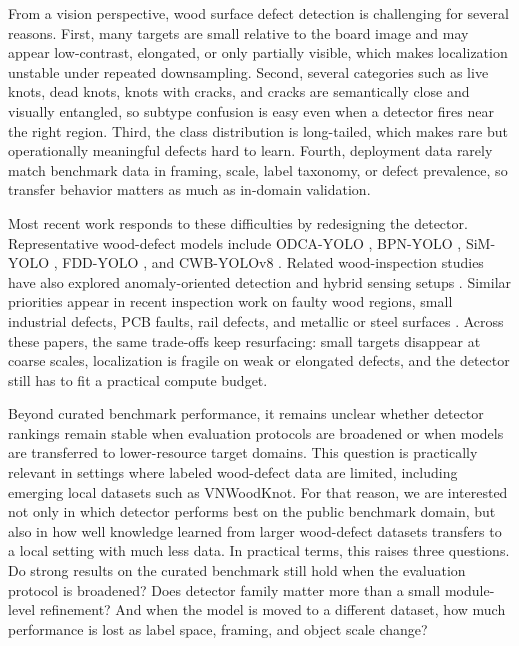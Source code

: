 \documentclass[journal,article,submit,moreauthors,pdftex]{Definitions/tsp}
\begin{document}
From a vision perspective, wood surface defect detection is challenging for several reasons. First, many targets are small relative to the board image and may appear low-contrast, elongated, or only partially visible, which makes localization unstable under repeated downsampling. Second, several categories such as live knots, dead knots, knots with cracks, and cracks are semantically close and visually entangled, so subtype confusion is easy even when a detector fires near the right region. Third, the class distribution is long-tailed, which makes rare but operationally meaningful defects hard to learn. Fourth, deployment data rarely match benchmark data in framing, scale, label taxonomy, or defect prevalence, so transfer behavior matters as much as in-domain validation.

Most recent work responds to these difficulties by redesigning the detector. Representative wood-defect models include ODCA-YOLO \citep{odca_yolo}, BPN-YOLO \citep{bpn_yolo}, SiM-YOLO \citep{sim_yolo}, FDD-YOLO \citep{fdd_yolo}, and CWB-YOLOv8 \citep{an_cwb_yolov8}. Related wood-inspection studies have also explored anomaly-oriented detection and hybrid sensing setups \citep{kilic_2024,kilic_2025_wd_detector}. Similar priorities appear in recent inspection work on faulty wood regions, small industrial defects, PCB faults, rail defects, and metallic or steel surfaces \citep{cmc_wood_area_attention,cmc_insulator_small,cmc_pcb_yolov8,cmc_cg_yolov8,cmc_rail_upernet,cmc_yolo_rlc,cmc_lmvit,cmc_msese,cmc_flame,cmc_channel_shuffle}. Across these papers, the same trade-offs keep resurfacing: small targets disappear at coarse scales, localization is fragile on weak or elongated defects, and the detector still has to fit a practical compute budget.


Beyond curated benchmark performance, it remains unclear whether detector rankings remain stable when evaluation protocols are broadened or when models are transferred to lower-resource target domains. This question is practically relevant in settings where labeled wood-defect data are limited, including emerging local datasets such as VNWoodKnot. For that reason, we are interested not only in which detector performs best on the public benchmark domain, but also in how well knowledge learned from larger wood-defect datasets transfers to a local setting with much less data. In practical terms, this raises three questions. Do strong results on the curated benchmark still hold when the evaluation protocol is broadened? Does detector family matter more than a small module-level refinement? And when the model is moved to a different dataset, how much performance is lost as label space, framing, and object scale change?
\end{document}
